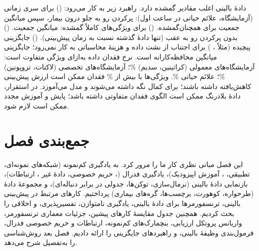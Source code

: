 دادۀ بالینی اغلب مقادیر گمشده دارد. راهبرد زیر به کار می‌رود: () برای سری زمانی (آزمایشگاه، علائم حیاتی در  ساعت اول): پرکردن رو به جلو درون بیمار، سپس میانگین جمعیت برای همچنان‌گمشده. () برای ویژگی‌های کاملاً گمشده: میانگین جمعیت. () بدون پرکردن رو به عقب (تنها دادۀ گذشته نسبت به زمان پیش‌بینی). () جایگزینی پیچیده (مثلاً ، ) برای اجتناب از نشت داده و هزینۀ محاسباتی به کار نمی‌رود؛ جایگزینی میانگین محافظه‌کارانه است. نرخ فقدان داده به‌ازای ویژگی متفاوت است: آزمایشگاه‌های معمولی (کراتینین، سدیم) \%؛ آزمایشگاه‌های تخصصی (لاکتات، تروپونین) \%؛ علائم حیاتی \%. ویژگی‌ها با بیش از \% فقدان ممکن است ارزش پیش‌بینی کاهش‌یافته داشته باشند؛ برای کمال نگه داشته می‌شوند و مدل می‌آموزد. در استقرار، دادۀ بلادرنگ ممکن است الگوی فقدان متفاوتی داشته باشد؛ پایش و آموزش مجدد ممکن است لازم شود.

\section{جمع‌بندی فصل}

این فصل مبانی نظری کار ما را مرور کرد. به یادگیری کم‌نمونه (شبکه‌های نمونه‌ای، تطبیقی، ، آموزش اپیزودیک)، یادگیری فدرال (، حریم خصوصی، دادۀ غیر ، ارتباطات)، بازنمایی دادۀ بالینی (نرمال‌سازی، توکن‌ها، جدولی در برابر دنباله‌ای)، و مجموعۀ دادۀ  (طرحواره، کوهورت، برچسب‌ها، گره‌های بیماری) پرداختیم. کارهای مرتبط در پیش‌بینی بالینی، ترنسفورمرها برای دادۀ بالینی، یادگیری نامتوازن، تفسیرپذیری، و  اخلاقی را بحث کردیم. همچنین جدول مقایسۀ کارهای پیشین، جزئیات معماری ترنسفورمر، واریانس پروتکل ارزیابی، بنچمارک‌های کم‌نمونه، ارتباطات و حریم خصوصی فدرال، فرمول‌بندی وظیفۀ بالینی، و راهبردهای جایگزینی را ارائه دادیم. فصل بعد روش‌شناسی را به‌تفصیل شرح می‌دهد.
